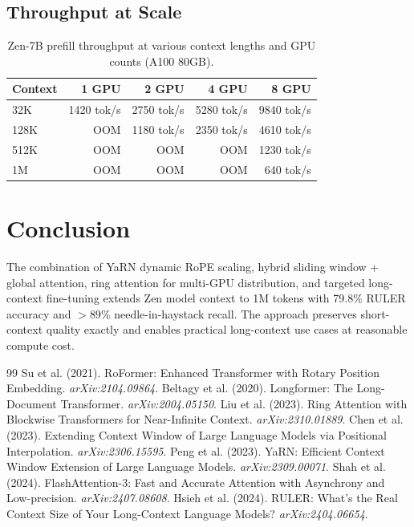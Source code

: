 \documentclass[11pt,a4paper]{article}
\begin{document}
\subsection{Throughput at Scale}

\begin{table}[H]
\centering
\begin{tabular}{lrrrr}
\toprule
\textbf{Context} & \textbf{1 GPU} & \textbf{2 GPU} & \textbf{4 GPU} & \textbf{8 GPU} \\
\midrule
32K & 1420 tok/s & 2750 tok/s & 5280 tok/s & 9840 tok/s \\
128K & OOM & 1180 tok/s & 2350 tok/s & 4610 tok/s \\
512K & OOM & OOM & OOM & 1230 tok/s \\
1M & OOM & OOM & OOM & 640 tok/s \\
\bottomrule
\end{tabular}
\caption{Zen-7B prefill throughput at various context lengths and GPU counts (A100 80GB).}
\end{table}

\section{Conclusion}

The combination of YaRN dynamic RoPE scaling, hybrid sliding window + global attention,
ring attention for multi-GPU distribution, and targeted long-context fine-tuning
extends Zen model context to 1M tokens with 79.8\% RULER accuracy and $>89\%$
needle-in-haystack recall. The approach preserves short-context quality exactly
and enables practical long-context use cases at reasonable compute cost.


\begin{thebibliography}{99}
 Su et al. (2021). RoFormer: Enhanced Transformer with Rotary Position Embedding. \textit{arXiv:2104.09864}.
 Beltagy et al. (2020). Longformer: The Long-Document Transformer. \textit{arXiv:2004.05150}.
 Liu et al. (2023). Ring Attention with Blockwise Transformers for Near-Infinite Context. \textit{arXiv:2310.01889}.
 Chen et al. (2023). Extending Context Window of Large Language Models via Positional Interpolation. \textit{arXiv:2306.15595}.
 Peng et al. (2023). YaRN: Efficient Context Window Extension of Large Language Models. \textit{arXiv:2309.00071}.
 Shah et al. (2024). FlashAttention-3: Fast and Accurate Attention with Asynchrony and Low-precision. \textit{arXiv:2407.08608}.
 Hsieh et al. (2024). RULER: What's the Real Context Size of Your Long-Context Language Models? \textit{arXiv:2404.06654}.
\end{thebibliography}
\end{document}
